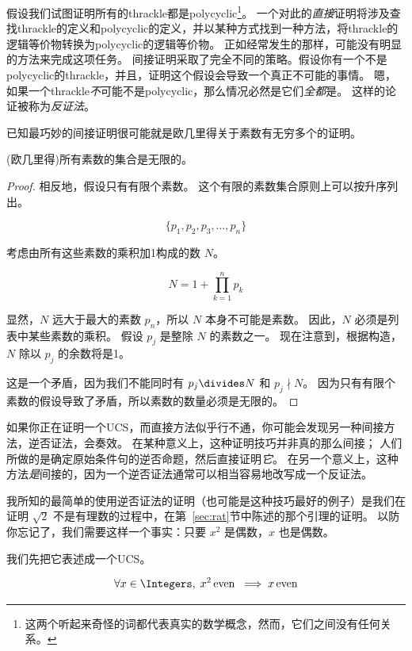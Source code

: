 假设我们试图证明所有的thrackle都是polycyclic\footnote{这两个听起来奇怪的词都代表真实的数学概念，然而，它们之间没有任何关系。}。
一个对此的{\em 直接}证明将涉及查找thrackle的定义和polycyclic的定义，并以某种方式找到一种方法，将thrackle的逻辑等价物转换为polycyclic的逻辑等价物。
正如经常发生的那样，可能没有明显的方法来完成这项任务。
间接证明采取了完全不同的策略。假设你有一个不是polycyclic的thrackle，并且，证明这个假设会导致一个真正不可能的事情。
嗯，如果一个thrackle{\em 不}可能不是polycyclic，那么情况必然是它们{\em 全都}是。
这样的论证被称为\emph{反证法}。

已知最巧妙的间接证明很可能就是欧几里得关于素数有无穷多个的证明。

\begin{thm} (欧几里得)所有素数的集合是无限的。
\end{thm}

\begin{proof} 
      相反地，假设只有有限个素数。
      这个有限的素数集合原则上可以按升序列出。

      \[  \{ p_1, p_2, p_3, \ldots , p_n \} \]

      考虑由所有这些素数的乘积加1构成的数 $N$。

      \[ N = 1 + \prod_{k=1}^n p_k \]

      显然，$N$ 远大于最大的素数 $p_n$，所以 $N$ 本身不可能是素数。
      因此，$N$ 必须是列表中某些素数的乘积。
      假设 $p_j$ 是整除 $N$ 的素数之一。
      现在注意到，根据构造，$N$ 除以 $p_j$ 的余数将是1。

      这是一个矛盾，因为我们不能同时有 $p_j \divides N$ 和 $p_j \nmid N$。
      因为只有有限个素数的假设导致了矛盾，所以素数的数量必须是无限的。
\end{proof}

如果你正在证明一个UCS，而直接方法似乎行不通，你可能会发现另一种间接方法，逆否证法，会奏效。
在某种意义上，这种证明技巧并非真的那么间接；
人们所做的是确定原始条件句的逆否命题，然后直接证明{\em 它}。
在另一个意义上，这种方法{\em 是}间接的，因为一个逆否证法通常可以相当容易地改写成一个反证法。

我所知的最简单的使用逆否证法的证明（也可能是这种技巧最好的例子）是我们在证明 $\sqrt{2}$ 不是有理数的过程中，在第~\ref{sec:rat}节中陈述的那个引理的证明。
以防你忘记了，我们需要这样一个事实：只要 $x^2$ 是偶数，$x$ 也是偶数。

我们先把它表述成一个UCS。

\[ \forall x \in \Integers, \; x^2 \, \mbox{even} \; \implies x \, \mbox{even}
\]

